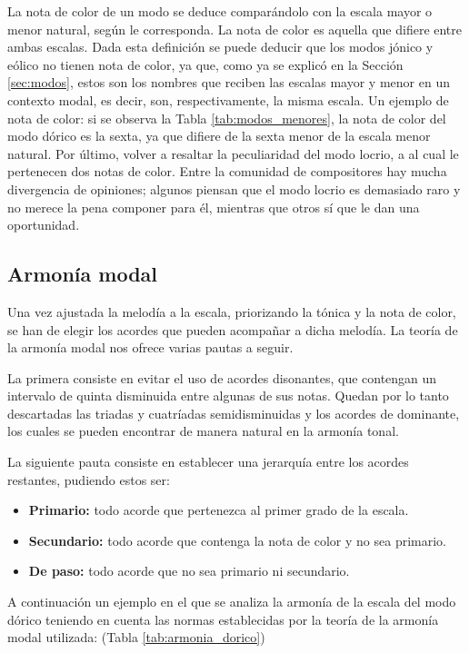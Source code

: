 La nota de color de un modo se deduce comparándolo con la escala mayor o menor natural, según le corresponda. La nota de color es aquella que difiere entre ambas escalas. Dada esta definición se puede deducir que los modos jónico y eólico no tienen nota de color, ya que, como ya se explicó en la Sección \ref{sec:modos}, estos son los nombres que reciben las escalas mayor y menor en un contexto modal, es decir, son, respectivamente, la misma escala. Un ejemplo de nota de color: si se observa la Tabla \ref{tab:modos_menores}, la nota de color del modo dórico es la sexta, ya que difiere de la sexta menor de la escala menor natural. Por último, volver a resaltar la peculiaridad del modo locrio, a al cual le pertenecen dos notas de color. Entre la comunidad de compositores hay mucha divergencia de opiniones; algunos piensan que el modo locrio es demasiado raro y no merece la pena componer para él, mientras que otros sí que le dan una oportunidad.

\subsection{Armonía modal}

Una vez ajustada la melodía a la escala, priorizando la tónica y la nota de color, se han de elegir los acordes que pueden acompañar a dicha melodía. La teoría de la armonía modal nos ofrece varias pautas a seguir.

La primera consiste en evitar el uso de acordes disonantes, que contengan un intervalo de quinta disminuida entre algunas de sus notas. Quedan por lo tanto descartadas las triadas y cuatríadas semidisminuidas y los acordes de dominante, los cuales se pueden encontrar de manera natural en la armonía tonal.

La siguiente pauta consiste en establecer una jerarquía entre los acordes restantes, pudiendo estos ser:

\begin{itemize}[label=$\bullet$]
    \item \textbf{\textcolor{rojo}{Primario}:} todo acorde que pertenezca al primer grado de la escala. 
    \item \textbf{\textcolor{azul}{Secundario}:} todo acorde que contenga la nota de color y no sea primario. 
    \item \textbf{De paso:} todo acorde que no sea primario ni secundario. 
\end{itemize}

A continuación un ejemplo en el que se analiza la armonía de la escala del modo dórico teniendo en cuenta las normas establecidas por la teoría de la armonía modal utilizada: (Tabla \ref{tab:armonia_dorico})


